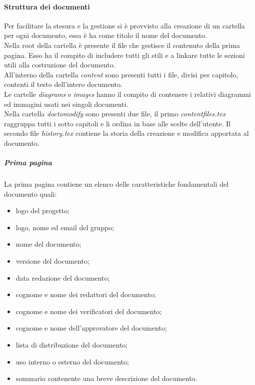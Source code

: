 			\paragraph{Struttura dei documenti}
			Per facilitare la stesura e la gestione si è provvisto alla creazione di un cartella per ogni documento, essa è ha come titolo il nome del documento.\\
			Nella root della cartella è presente il file che gestisce il contenuto della prima pagina. Esso ha il compito di includere tutti gli stili e a linkare tutte le sezioni utili alla costruzione del documento.\\
			All'interno della cartella \emph{content} sono presenti tutti i file, divisi per capitolo, contenti il testo dell'intero documento.\\
			Le cartelle \emph{diagrams} e \emph{images} hanno il compito di contenere i relativi diagrammi ed immagini usati nei singoli documenti.\\
			Nella cartella \emph{doc\textunderscore to\textunderscore modify} sono presenti due file, il primo \emph{content\textunderscore files.tex} raggruppa tutti i sotto capitoli e li ordina in base alle scelte dell'utente. Il secondo file \emph{history.tex} contiene la storia della creazione e modifica apportata al documento.

				\subparagraph{Prima pagina}
				La prima pagina contiene un elenco delle caratteristiche fondamentali del documento quali:
				\begin{itemize}
					\item logo del progetto;
					\item logo, nome ed email del gruppo;
					\item nome del documento;
					\item versione del documento;
					\item data redazione del documento;
					\item cognome e nome dei redattori del documento;
					\item cognome e nome dei verificatori del documento;
					\item cognome e nome dell'approvatore del documento;
					\item lista di distribuzione del documento;
					\item uso interno o esterno del documento;
					\item sommario contenente una breve descrizione del documento.
				\end{itemize}

